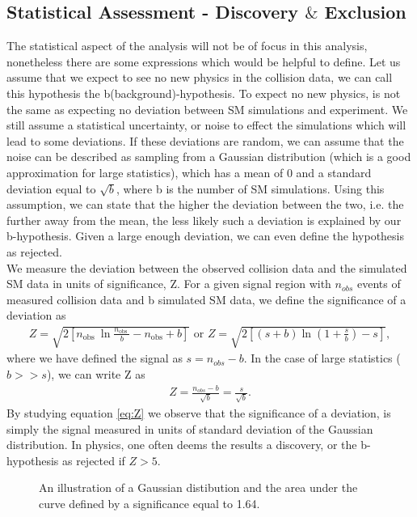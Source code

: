 \subsection{Statistical Assessment - Discovery $\&$ Exclusion}\label{subsec:Sensitivity}
The statistical aspect of the analysis will not be of focus in this analysis, nonetheless there are 
some expressions which would be helpful to define. Let us assume that we expect to see no new physics in the collision
data, we can call this hypothesis the b(background)-hypothesis. To expect no new physics, is not the same as expecting no 
deviation between \ac{SM} simulations and experiment. We still assume a statistical uncertainty, or noise to effect the simulations which 
will lead to some deviations. If these deviations are random, we can assume that the noise can be described as sampling from a Gaussian distribution 
(which is a good approximation for large statistics), which has a mean of 0 and a standard deviation equal to $\sqrt{b}$, where b is 
the number of \ac{SM} simulations. Using this assumption, we can state that the higher the deviation between the two, i.e. the further away 
from the mean, the less likely such a deviation is explained by our b-hypothesis. Given a large enough deviation, we can even 
define the hypothesis as rejected.
\\
We measure the deviation between the observed collision data and the simulated \ac{SM} data in units of significance, Z. 
For a given signal region with $n_{obs}$ events of measured collision data and b simulated \ac{SM} data, we define
the significance of a deviation as
\begin{align}\label{eq:Z1}
Z=\sqrt{2\left[n_{\text {obs }} \ln \frac{n_{\text {obs }}}{b}-n_{\mathrm{obs}}+b\right]} \text { or } 
Z=\sqrt{2\left[(s+b) \ln \left(1+\frac{s}{b}\right)-s\right]}, 
\end{align}
where we have defined the signal as $s = n_{obs} - b$. In the case of large statistics ($b>>s$), we can write Z 
as 
\begin{align}\label{eq:Z}
    Z=\frac{n_{o b s}-b}{\sqrt{b}} = \frac{s}{\sqrt{b}}.
\end{align}
By studying equation \ref{eq:Z} we observe that the significance of a deviation, is simply the signal measured in units of standard
deviation of the Gaussian distribution. In physics, one often deems the results a discovery, or the b-hypothesis as rejected if $Z>5$. 
\\
\begin{figure}[H]
    \centering
    \caption{An illustration of a Gaussian distibution and the area under the curve defined by a significance equal to 1.64.}
    \label{fig:ConfInt}
\end{figure}
